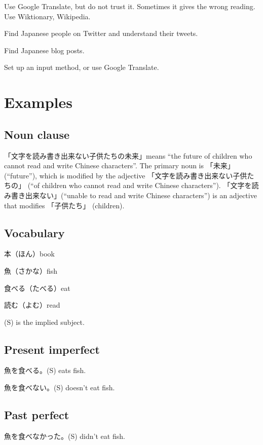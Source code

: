 \documentclass[12pt,a4paper,openany]{book}
\begin{document}
Use Google Translate, but do not trust it.
Sometimes it gives the wrong reading.
Use Wiktionary, Wikipedia.

Find Japanese people on Twitter and understand their tweets.

Find Japanese blog posts.

Set up an input method, or use Google Translate.

\chapter{Examples}


\section{Noun clause}

「文字を読み書き出来ない子供たちの未来」means
``the future of children who cannot read and write Chinese characters''.
The primary noun is 「未来」 (``future''),
which is modified by the adjective
「文字を読み書き出来ない子供たちの」
(``of children who cannot read and write Chinese characters'').
「文字を読み書き出来ない」(``unable to read and write Chinese characters'')
is an adjective that modifies 「子供たち」 (children).

\section{Vocabulary}

本（ほん）book

魚（さかな）fish

食べる（たべる）eat

読む（よむ）read

(S) is the implied subject.

\section{Present imperfect}

魚を食べる。(S) eats fish.

魚を食べない。(S) doesn't eat fish.

\section{Past perfect}

魚を食べなかった。(S) didn't eat fish.
\end{document}
